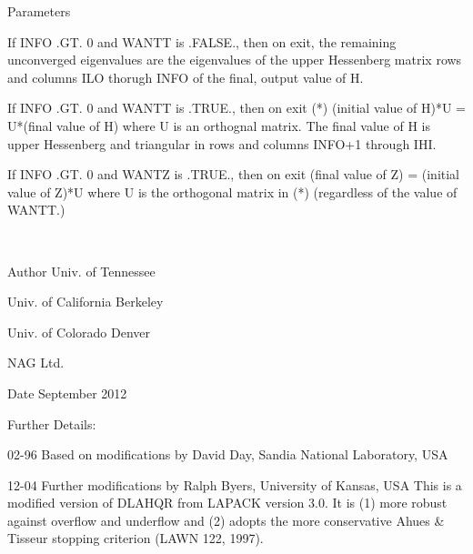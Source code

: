 \begin{DoxyParams}[1]{Parameters}
\begin{DoxyVerb}
                  If INFO .GT. 0 and WANTT is .FALSE., then on exit,
                  the remaining unconverged eigenvalues are the
                  eigenvalues of the upper Hessenberg matrix rows
                  and columns ILO thorugh INFO of the final, output
                  value of H.

                  If INFO .GT. 0 and WANTT is .TRUE., then on exit
          (*)       (initial value of H)*U  = U*(final value of H)
                  where U is an orthognal matrix.    The final
                  value of H is upper Hessenberg and triangular in
                  rows and columns INFO+1 through IHI.

                  If INFO .GT. 0 and WANTZ is .TRUE., then on exit
                      (final value of Z)  = (initial value of Z)*U
                  where U is the orthogonal matrix in (*)
                  (regardless of the value of WANTT.)\end{DoxyVerb}
 \\
\hline
\end{DoxyParams}
\begin{DoxyAuthor}{Author}
Univ. of Tennessee 

Univ. of California Berkeley 

Univ. of Colorado Denver 

N\+A\+G Ltd. 
\end{DoxyAuthor}
\begin{DoxyDate}{Date}
September 2012 
\end{DoxyDate}
\begin{DoxyParagraph}{Further Details\+: }
\begin{DoxyVerb}     02-96 Based on modifications by
     David Day, Sandia National Laboratory, USA

     12-04 Further modifications by
     Ralph Byers, University of Kansas, USA
     This is a modified version of DLAHQR from LAPACK version 3.0.
     It is (1) more robust against overflow and underflow and
     (2) adopts the more conservative Ahues & Tisseur stopping
     criterion (LAWN 122, 1997).\end{DoxyVerb}
 
\end{DoxyParagraph}

